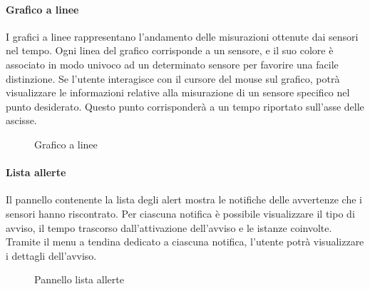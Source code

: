 \paragraph{Grafico a linee}
\hypertarget{par:grafico_linee}{}
I grafici a linee rappresentano l'andamento delle misurazioni ottenute dai sensori nel tempo. Ogni linea del grafico corrisponde a un sensore, e il suo colore è associato in modo univoco ad un determinato sensore per favorire una facile distinzione. Se l'utente interagisce con il cursore del mouse sul grafico, potrà visualizzare le informazioni relative alla misurazione di un sensore specifico nel punto desiderato. Questo punto corrisponderà a un tempo riportato sull'asse delle ascisse. 
\begin{figure}[H]
    \centering
    \caption{Grafico a linee}
    \label{fig:my_label}
\end{figure}

\paragraph{Lista allerte}
Il pannello contenente la lista degli alert mostra le notifiche delle avvertenze che i sensori hanno riscontrato. Per ciascuna notifica è possibile visualizzare il tipo di avviso, il tempo trascorso dall'attivazione dell'avviso e le istanze coinvolte.\\
Tramite il menu a tendina dedicato a ciascuna notifica, l'utente potrà visualizzare i dettagli dell'avviso.
\begin{figure}[H]
    \centering
    \caption{Pannello lista allerte}
    \label{fig:my_label}
\end{figure}

